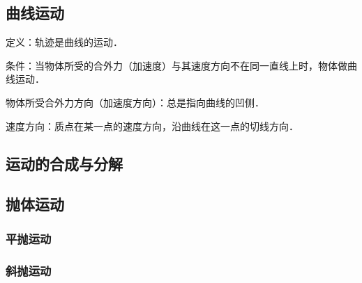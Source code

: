 
\begin{issues}
\issueDraft
\issueTODO
\end{issues}

\subsection{曲线运动}

定义：轨迹是曲线的运动．

条件：当物体所受的合外力（加速度）与其速度方向不在同一直线上时，物体做曲线运动．

物体所受合外力方向（加速度方向）：总是指向曲线的凹侧．

速度方向：质点在某一点的速度方向，沿曲线在这一点的切线方向．

\subsection{运动的合成与分解}

\subsection{抛体运动}

\subsubsection{平抛运动}

\subsubsection{斜抛运动}
